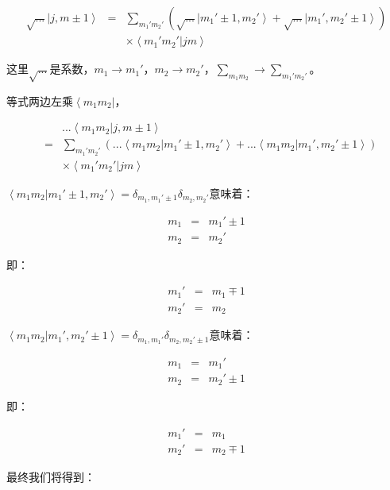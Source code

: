\begin{eqnarray*}
\sqrt{...} \left| j, m \pm 1 \right\rangle & = & \sum\limits_{m_1' m_2'}  \left( \sqrt{...} \left| m_1' \pm 1 , m_2' \right\rangle + \sqrt{...} \left| m_1', m_2' \pm 1 \right\rangle \right) \\
{} & {} &  \times \left\langle m_1' m_2' | j m \right\rangle
\end{eqnarray*}

这里$\sqrt{...}$是系数，$m_1 \to m_1' $，$m_2 \to m_2'$，$\sum\limits_{m_1 m_2 } \to \sum\limits_{m_1' m_2' }$。

等式两边左乘$\left\langle m_1 m_2 \right|$，

\begin{eqnarray*}
{} & {} & ...\left\langle m_1 m_2 | j, m \pm 1 \right\rangle \\
{} & = &  \sum\limits_{m_1' m_2'} \left( ... \left\langle m_1 m_2 | m_1' \pm 1 , m_2' \right\rangle  + ... \left\langle m_1 m_2 | m_1', m_2' \pm 1 \right\rangle  \right) \\
{} & {} & \times \left\langle m_1' m_2' | j m \right\rangle 
\end{eqnarray*}

$\left\langle m_1 m_2 | m_1' \pm 1 , m_2' \right\rangle = \delta_{m_1, m_1' \pm 1 }  \delta_{m_2 , m_2'} $意味着：

\begin{eqnarray*}
m_1 & = & m_1' \pm 1 \\
m_2 & = & m_2'
\end{eqnarray*}

即：

\begin{eqnarray*}
m_1' & = & m_1 \mp 1 \\
m_2' & = & m_2
\end{eqnarray*}

$\left\langle m_1 m_2 | m_1', m_2' \pm 1 \right\rangle = \delta_{m_1 , m_1'} \delta_{m_2 , m_2'  \pm 1}$意味着：

\begin{eqnarray*}
m_1 & = & m_1' \\
m_2 & = & m_2'  \pm 1
\end{eqnarray*}

即：

\begin{eqnarray*}
m_1' & = & m_1 \\
m_2' & = & m_2  \mp 1
\end{eqnarray*}

最终我们将得到：

